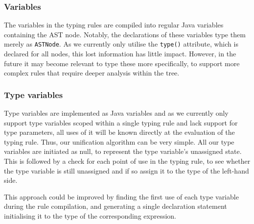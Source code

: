 \documentclass[nofilelist]{cslthse-msc}
\newcommand{\CR}[1]{\textcolor{green!60!black}{[\textbf{CR}:#1]}}
\newcommand{\reviewquestion}[1]{\textcolor{red!80!black}{[\textbf{Review question}:#1]}}
\begin{document}


\subsubsection{Variables}
The variables in the typing rules are compiled into regular Java variables containing the AST node.
Notably, the declarations of these variables type them merely as \lstinline{ASTNode}.
As we currently only utilise the \lstinline{type()} attribute, which is declared for all nodes, this lost information has little impact.
However, in the future it may become relevant to type these more specifically, to support more complex rules that require deeper analysis within the tree.

\subsubsection{Type variables}
Type variables are implemented as Java variables and as we currently only support type variables scoped within a single typing rule and lack support for type parameters, all uses of it will be known directly at the evaluation of the typing rule.
Thus, our unification algorithm can be very simple.
All our type variables are initiated as null, to represent the type variable's unassigned state.
This is followed by a check for each point of use in the typing rule, to see whether the type variable is still unassigned and if so assign it to the type of the left-hand side.

This approach could be improved by finding the first use of each type variable during the rule compilation, and generating a single declaration statement initialising it to the type of the corresponding expression.

\end{document}
